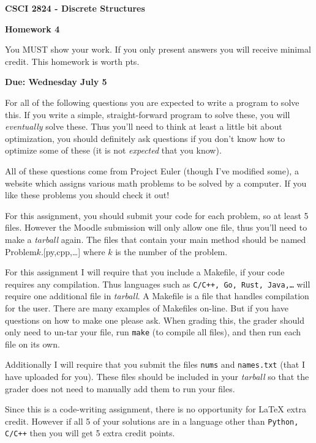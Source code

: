 \documentclass[addpoints]{exam}
\begin{document}
\singlespacing

\begin{center}
  {\large\textbf{CSCI 2824 - Discrete Structures}}

  {\large\textbf{Homework 4}}
\end{center}

You MUST show your work. If you only present answers you will receive minimal
credit. This homework is worth \numpoints pts.

\textbf{Due: Wednesday July 5}

For all of the following questions you are expected to write a program to solve
this. If you write a simple, straight-forward program to solve these, you will
\emph{eventually} solve these. Thus you'll need to think at least a little bit
about optimization, you should definitely ask questions if you don't know how to
optimize some of these (it is not \emph{expected} that you know).

All of these questions come from Project Euler (though I've modified some), a
website which assigns various math problems to be solved by a computer. If you
like these problems you should check it out!

For this assignment, you should submit your code for each problem, so at least 5
files. However the Moodle submission will only allow one file, thus you'll need
to make a \emph{tarball} again. The files that contain your main method should
be named Problem$k$.[py,cpp,\dots] where $k$ is the number of the problem.

For this assignment I will require that you include a Makefile, if your code
requires any compilation. Thus languages such as \texttt{C/C++, Go, Rust,
Java,\dots} will require one additional file in \emph{tarball}. A Makefile is a
file that handles compilation for the user. There are many examples of Makefiles
on-line. But if you have questions on how to make one please ask. When grading
this, the grader should only need to un-tar your file, run \texttt{make} (to
compile all files), and then run each file on its own.

Additionally I will require that you submit the files \texttt{nums} and 
\texttt{names.txt} (that I have uploaded for you). These files should be
included in your \emph{tarball} so that the grader does not need to manually add
them to run your files.

Since this is a code-writing assignment, there is no opportunity for \LaTeX
extra credit. However if all 5 of your solutions are in a language other than
\texttt{Python, C/C++} then you will get 5 extra credit points.
\end{document}
